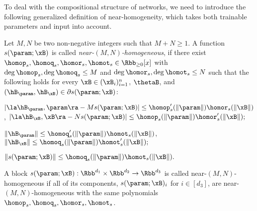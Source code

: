 To deal with the compositional structure of networks, we need to introduce the following generalized definition of near-homogeneity, which takes both trainable parameters and input into account.

\begin{definition}
\label{def:dual-homo}
Let $M, N$ be two non-negative integers such that $M + N \ge 1$.
A function $s(\param; \xB)$ is called \emph{near-$(M, N)$-homogeneous},
if there exist $\homop_s, \homoq_s,\homor_s, \homot_s \in \Rbb_{\ge 0} [x]$ with $\deg \homop_s, \deg\homoq_s \le M$ and $ \deg \homor_s, \deg \homot_s \le N $ such that the following holds
for every $\xB\in(\xB_i)_{i=1}^n$, $\thetaB$, and $(\hB_{\param}, \hB_{\xB}) \in  \partial s(\param ;\xB)$:
\begin{assumpenum}
    \item %
  \(
     | \la\hB_{\param}, \param \ra  - M s(\param;\xB) | \le \homop_s^\prime (\|\param\|) \homor_s(\|\xB\|) \),   \(  
     | \la \hB_{\xB}, \xB \ra - N  s(\param;\xB) | \le \homop_s (\|\param\|) \homor_s^\prime(\|\xB\|);
  \)
  

  \item %
    \(\| \hB_{\param} \| \le \homoq_s^\prime (\|\param\|) \homot_s(\|\xB\|)\), 
    \(\| \hB_{\xB} \| \le \homoq_s (\|\param\|) \homot_s^\prime(\|\xB\|);\)
 \item %
    \(
        \|s(\param;\xB)\| \le \homoq_s (\|\param\|) \homot_s(\|\xB\|).
    \) 
\end{assumpenum}
A block $s(\param;\xB) : \Rbb^{d_1} \times \Rbb^{d_2} \to \Rbb^{d_3} $ is called near-$(M, N)$-homogeneous if all of its components,
$ s(\param;\xB)_{i}$ for $i \in [d_3]$, 
are near-$(M,N)$-homogeneous with the same polynomials $\homop_s, \homoq_s,\homor_s, \homot_s$.
\end{definition}

